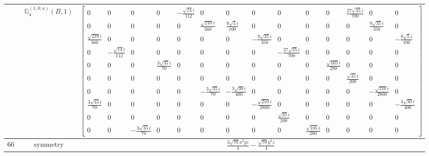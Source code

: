 \documentclass[fleqn,8pt,landscape]{jsarticle}
\begin{document}
\begin{longtable}{ccc}
$  $ & $ \mathbb{G}_{4}^{(1,0;a)}(B,1) $ & $ \begin{bmatrix} 0 & 0 & 0 & 0 & - \frac{\sqrt{14} i}{112} & 0 & 0 & 0 & 0 & 0 & 0 & \frac{27 \sqrt{35} i}{700} & 0 & 0 \\ 0 & 0 & 0 & 0 & 0 & \frac{\sqrt{210} i}{560} & \frac{9 \sqrt{5} i}{100} & 0 & 0 & 0 & 0 & 0 & \frac{9 \sqrt{35} i}{350} & 0 \\ \frac{\sqrt{210} i}{560} & 0 & 0 & 0 & 0 & 0 & 0 & - \frac{9 \sqrt{35} i}{350} & 0 & 0 & 0 & 0 & 0 & - \frac{9 \sqrt{5} i}{100} \\ 0 & - \frac{\sqrt{14} i}{112} & 0 & 0 & 0 & 0 & 0 & 0 & - \frac{27 \sqrt{35} i}{700} & 0 & 0 & 0 & 0 & 0 \\ 0 & 0 & 0 & \frac{3 \sqrt{35} i}{70} & 0 & 0 & 0 & 0 & 0 & 0 & \frac{\sqrt{105} i}{280} & 0 & 0 & 0 \\ 0 & 0 & 0 & 0 & 0 & 0 & 0 & 0 & 0 & 0 & 0 & \frac{\sqrt{35} i}{200} & 0 & 0 \\ 0 & 0 & 0 & 0 & 0 & - \frac{3 \sqrt{35} i}{70} & - \frac{3 \sqrt{30} i}{400} & 0 & 0 & 0 & 0 & 0 & - \frac{\sqrt{210} i}{2800} & 0 \\ \frac{3 \sqrt{35} i}{70} & 0 & 0 & 0 & 0 & 0 & 0 & - \frac{\sqrt{210} i}{2800} & 0 & 0 & 0 & 0 & 0 & - \frac{3 \sqrt{30} i}{400} \\ 0 & 0 & 0 & 0 & 0 & 0 & 0 & 0 & \frac{\sqrt{35} i}{200} & 0 & 0 & 0 & 0 & 0 \\ 0 & 0 & - \frac{3 \sqrt{35} i}{70} & 0 & 0 & 0 & 0 & 0 & 0 & \frac{\sqrt{105} i}{280} & 0 & 0 & 0 & 0 \end{bmatrix} $ \\ \hline
$ 667 $ & $ \text{symmetry} $ & $ \frac{3 \sqrt{70} x^{2} y z}{4} - \frac{\sqrt{70} y^{3} z}{4} $ \\

\end{longtable}
\end{document}
